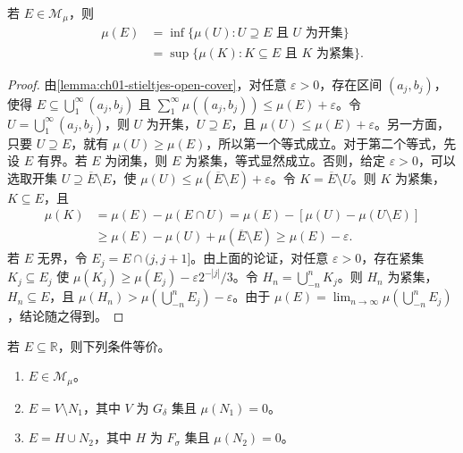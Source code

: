 \documentclass[../../main.tex]{subfiles}%
\begin{document}
\begin{theorem}\label{theorem:ch01-stieltjes-regularity}
若 $E\in\mathscr{M}_\mu$，则
\begin{align*}
\mu(E)&=\inf\{\mu(U):U\supseteq E\text{ 且 }U\text{ 为开集}\}\\
&=\sup\{\mu(K):K\subseteq E\text{ 且 }K\text{ 为紧集}\}.
\end{align*}
\end{theorem}

\begin{proof}
由\cref{lemma:ch01-stieltjes-open-cover}，对任意 $\varepsilon>0$，存在区间 $(a_j,b_j)$，使得 $E\subseteq\bigcup_1^\infty(a_j,b_j)$ 且 $\sum_1^\infty\mu((a_j,b_j))\leqslant\mu(E)+\varepsilon$。令 $U=\bigcup_1^\infty(a_j,b_j)$，则 $U$ 为开集，$U\supseteq E$，且 $\mu(U)\leqslant\mu(E)+\varepsilon$。另一方面，只要 $U\supseteq E$，就有 $\mu(U)\geqslant\mu(E)$，所以第一个等式成立。对于第二个等式，先设 $E$ 有界。若 $E$ 为闭集，则 $E$ 为紧集，等式显然成立。否则，给定 $\varepsilon>0$，可以选取开集 $U\supseteq\overline{E}\setminus E$，使 $\mu(U)\leqslant\mu(\overline{E}\setminus E)+\varepsilon$。令 $K=\overline{E}\setminus U$。则 $K$ 为紧集，$K\subseteq E$，且
\begin{align*}
\mu(K)&=\mu(E)-\mu(E\cap U)=\mu(E)-[\mu(U)-\mu(U\setminus E)]\\
&\geqslant\mu(E)-\mu(U)+\mu(\overline{E}\setminus E)\geqslant\mu(E)-\varepsilon.
\end{align*}
若 $E$ 无界，令 $E_j=E\cap(j,j+1]$。由上面的论证，对任意 $\varepsilon>0$，存在紧集 $K_j\subseteq E_j$ 使 $\mu(K_j)\geqslant\mu(E_j)-\varepsilon2^{-|j|}/3$。令 $H_n=\bigcup_{-n}^n K_j$。则 $H_n$ 为紧集，$H_n\subseteq E$，且 $\mu(H_n)>\mu(\bigcup_{-n}^n E_j)-\varepsilon$。由于 $\mu(E)=\lim_{n\to\infty}\mu(\bigcup_{-n}^n E_j)$，结论随之得到。
\end{proof}

\begin{theorem}\label{theorem:ch01-stieltjes-measurable-sets}
若 $E\subseteq\mathbb{R}$，则下列条件等价。
\begin{enumerate}[label=\alph*.,ref=(\alph*)]
\item\label{item:ch01-stieltjes-measurable-condition} $E\in\mathscr{M}_\mu$。
\item\label{item:ch01-stieltjes-g-delta-condition} $E=V\setminus N_1$，其中 $V$ 为 $G_\delta$ 集且 $\mu(N_1)=0$。
\item\label{item:ch01-stieltjes-f-sigma-condition} $E=H\cup N_2$，其中 $H$ 为 $F_\sigma$ 集且 $\mu(N_2)=0$。
\end{enumerate}
\end{theorem}
\end{document}
